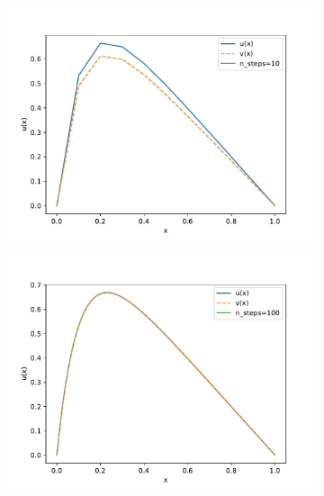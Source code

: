\documentclass[english,notitlepage]{revtex4-2}  %
\begin{document}
\begin{figure}[h]
	\centering
	\begin{subfigure}[b]{0.45\textwidth}
		\includegraphics[scale=0.5]{imgs/problem7b_output_10.pdf}	
	\end{subfigure}
	\begin{subfigure}[b]{0.45\textwidth}
		\includegraphics[scale=0.5]{imgs/problem7b_output_100.pdf}	
	\end{subfigure}	
	\begin{subfigure}[b]{0.45\textwidth}

\end{subfigure}
\end{figure}
\end{document}
